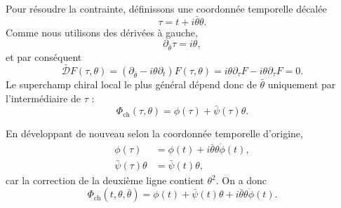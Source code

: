 Pour résoudre la contrainte, définissons une coordonnée temporelle décalée
\begin{equation}
\tau=t+i\bar\theta\theta.
\label{eq:l7-chiral-time}
\end{equation}
Comme nous utilisons des dérivées à gauche,
\begin{equation}
\partial_{\bar\theta}\tau=i\theta,
\end{equation}
et par conséquent
\begin{equation}
\bar{\mathcal D}F(\tau,\theta)
=\left(\partial_{\bar\theta}-i\theta\partial_t\right)F(\tau,\theta)
=i\theta\partial_\tau F-i\theta\partial_\tau F=0.
\end{equation}
Le superchamp chiral local le plus général dépend donc de \(\bar\theta\) uniquement par l’intermédiaire de \(\tau\) :
\begin{equation}
\Phi_{\mathrm{ch}}(\tau,\theta)
=\phi(\tau)+\bar\psi(\tau)\theta.
\label{eq:l7-chiral-field-tau}
\end{equation}

\begin{classroomqa}
\end{classroomqa}

En développant de nouveau selon la coordonnée temporelle d’origine,
\begin{align}
\phi(\tau)
&=\phi(t)+i\bar\theta\theta\dot\phi(t),\\
\bar\psi(\tau)\theta
&=\bar\psi(t)\theta,
\end{align}
car la correction de la deuxième ligne contient \(\theta^2\). On a donc
\begin{equation}
\Phi_{\mathrm{ch}}(t,\theta,\bar\theta)
=\phi(t)+\bar\psi(t)\theta
+i\bar\theta\theta\dot\phi(t).
\label{eq:l7-chiral-field-components}
\end{equation}

\begin{classroomqa}
\end{classroomqa}

